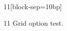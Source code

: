 \documentclass[paper=A4]{ropas-poster}
\begin{document}
\begin{postergrid}{1}{1}[block-sep=10bp]
\begin{posterblock}{1}{1}
Grid option test.
\end{posterblock}
\end{postergrid}
\end{document}
